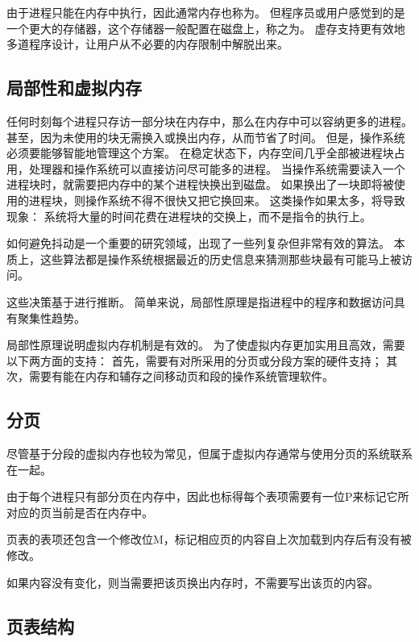 {    由于进程只能在内存中执行，因此通常内存也称为。
    但程序员或用户感觉到的是一个更大的存储器，这个存储器一般配置在磁盘上，称之为。
    虚存支持更有效地多道程序设计，让用户从不必要的内存限制中解脱出来。

    \subsection{局部性和虚拟内存}
    {
        任何时刻每个进程只存访一部分块在内存中，那么在内存中可以容纳更多的进程。
        甚至，因为未使用的块无需换入或换出内存，从而节省了时间。
        但是，操作系统必须要能够智能地管理这个方案。
        在稳定状态下，内存空间几乎全部被进程块占用，处理器和操作系统可以直接访问尽可能多的进程。
        当操作系统需要读入一个进程块时，就需要把内存中的某个进程快换出到磁盘。
        如果换出了一块即将被使用的进程块，则操作系统不得不很快又把它换回来。
        这类操作如果太多，将导致现象：
        系统将大量的时间花费在进程块的交换上，而不是指令的执行上。

        如何避免抖动是一个重要的研究领域，出现了一些列复杂但非常有效的算法。
        本质上，这些算法都是操作系统根据最近的历史信息来猜测那些块最有可能马上被访问。

        这些决策基于进行推断。
        简单来说，局部性原理是指进程中的程序和数据访问具有聚集性趋势。

        局部性原理说明虚拟内存机制是有效的。
        为了使虚拟内存更加实用且高效，需要以下两方面的支持：
        首先，需要有对所采用的分页或分段方案的硬件支持；
        其次，需要有能在内存和辅存之间移动页和段的操作系统管理软件。
    }

    \subsection{分页}
    {
        尽管基于分段的虚拟内存也较为常见，但属于虚拟内存通常与使用分页的系统联系在一起。

        由于每个进程只有部分页在内存中，因此也标得每个表项需要有一位P来标记它所对应的页当前是否在内存中。

        页表的表项还包含一个修改位M，标记相应页的内容自上次加载到内存后有没有被修改。

        如果内容没有变化，则当需要把该页换出内存时，不需要写出该页的内容。
    }

    \subsection{页表结构}
    {

    }
}
